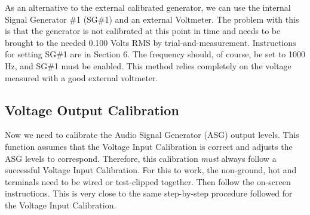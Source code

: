 As an alternative to the external calibrated generator,  we can use the internal Signal Generator \#1 (SG\#1) and an external Voltmeter.  The problem with this is that the generator is not calibrated at this point in time and needs to be brought to the needed 0.100 Volts RMS by trial-and-measurement.  Instructions for setting SG\#1 are in Section 6.  The frequency should, of course, be set to 1000 Hz, and SG\#1 must be enabled.   This method relies completely on the voltage measured with a good external voltmeter.

\subsection{Voltage Output Calibration} Now we need to calibrate the Audio Signal Generator (ASG) output levels.  This function assumes that the Voltage Input Calibration is correct and adjusts the ASG levels to correspond.  Therefore, this calibration \textit{must} always follow a successful Voltage Input Calibration.  For this to work, the non-ground, hot  and  terminals need to be wired  or test-clipped together.  Then follow the on-screen instructions.  This is very close to the same step-by-step procedure followed for the Voltage Input Calibration.

